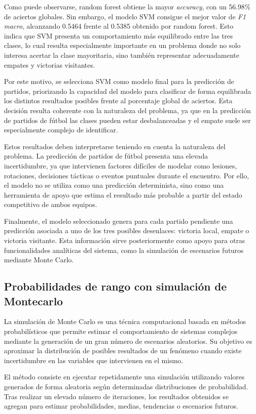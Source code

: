 Como puede observarse, random forest obtiene la mayor \textit{accuracy}, con un 56.98\% de aciertos globales. Sin embargo, el modelo SVM consigue el mejor valor de \textit{F1 macro}, alcanzando 0.5464 frente al 0.5385 obtenido por random forest. Esto indica que SVM presenta un comportamiento más equilibrado entre las tres clases, lo cual resulta especialmente importante en un problema donde no solo interesa acertar la clase mayoritaria, sino también representar adecuadamente empates y victorias
visitantes.

Por este motivo, se selecciona SVM como modelo final para la predicción de partidos, priorizando la capacidad del modelo para clasificar de forma equilibrada los distintos resultados posibles frente al porcentaje global de aciertos. Esta decisión resulta coherente con la naturaleza del problema, ya que en la predicción de partidos de fútbol las clases pueden estar desbalanceadas y el empate suele ser especialmente complejo de identificar.

Estos resultados deben interpretarse teniendo en cuenta la naturaleza del problema. La predicción de partidos de fútbol presenta una elevada incertidumbre, ya que intervienen factores difíciles de modelar como lesiones, rotaciones, decisiones tácticas o eventos puntuales durante el encuentro. Por ello, el modelo no se utiliza como una predicción determinista, sino como una herramienta de apoyo que estima el resultado más probable a partir del estado competitivo de ambos equipos.

Finalmente, el modelo seleccionado genera para cada partido pendiente una predicción asociada a uno de los tres posibles desenlaces: victoria local, empate o victoria visitante. Esta información sirve posteriormente como apoyo para otras funcionalidades analíticas del sistema, como la simulación de escenarios futuros mediante Monte Carlo.
\subsection{Probabilidades de rango con simulación de Montecarlo}
La simulación de Monte Carlo es una técnica computacional basada en métodos probabilísticos que permite estimar el comportamiento de sistemas complejos mediante la generación de un gran número de escenarios aleatorios. Su objetivo es aproximar la distribución de posibles resultados de un fenómeno cuando existe incertidumbre en las variables que intervienen en el mismo.

El método consiste en ejecutar repetidamente una simulación utilizando valores generados de forma aleatoria según determinadas distribuciones de probabilidad. Tras realizar un elevado número de iteraciones, los resultados obtenidos se agregan para estimar probabilidades, medias, tendencias o escenarios futuros.

